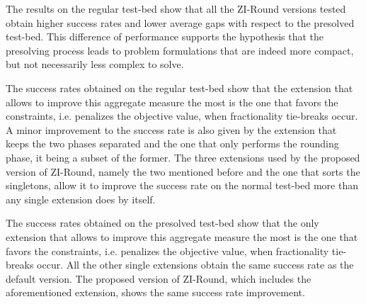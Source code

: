 \documentclass[a4paper,12pt,twoside]{scrbook}
\begin{document}
The results on the regular test-bed show that all the ZI-Round versions tested obtain higher success rates and lower average gaps with respect to the presolved test-bed. This difference of performance supports the hypothesis that the presolving process leads to problem formulations that are indeed more compact, but not necessarily less complex to solve. \par

The success rates obtained on the regular test-bed show that the extension that allows to improve this aggregate measure the most is the one that favors the constraints, i.e. penalizes the objective value, when fractionality tie-breaks occur. A minor improvement to the success rate is also given by the extension that keeps the two phases separated and the one that only performs the rounding phase, it being a subset of the former.
The three extensions used by the proposed version of ZI-Round, namely the two mentioned before and the one that sorts the singletons, allow it to improve the success rate on the normal test-bed more than any single extension does by itself. \par 

The success rates obtained on the presolved test-bed show that the only extension that allows to improve this aggregate measure the most is the one that favors the constraints, i.e. penalizes the objective value, when fractionality tie-breaks occur. All the other single extensions obtain the same success rate as the default version.
The proposed version of ZI-Round, which includes the aforementioned extension, shows the same success rate improvement. \par
\end{document}
